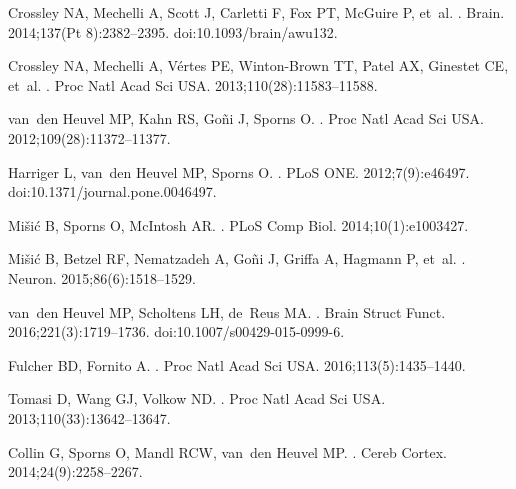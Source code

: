 \documentclass[10pt,letterpaper]{article}
\begin{document}
{\begin{thebibliography}{100}
Crossley NA, Mechelli A, Scott J, Carletti F, Fox PT, McGuire P, et~al.
.
\newblock Brain. 2014;137(Pt 8):2382--2395.
\newblock doi:{10.1093/brain/awu132}.

Crossley NA, Mechelli A, V{\'e}rtes PE, Winton-Brown TT, Patel AX, Ginestet CE,
  et~al.
.
\newblock Proc Natl Acad Sci USA. 2013;110(28):11583--11588.

van~den Heuvel MP, Kahn RS, Go{\~n}i J, Sporns O.
.
\newblock Proc Natl Acad Sci USA. 2012;109(28):11372--11377.

Harriger L, van~den Heuvel MP, Sporns O.
.
\newblock PLoS ONE. 2012;7(9):e46497.
\newblock doi:{10.1371/journal.pone.0046497}.

Mi{\v s}i{\'c} B, Sporns O, McIntosh AR.
.
\newblock PLoS Comp Biol. 2014;10(1):e1003427.

Mi{\v s}i{\'c} B, Betzel RF, Nematzadeh A, Go{\~n}i J, Griffa A, Hagmann P,
  et~al.
.
\newblock Neuron. 2015;86(6):1518--1529.

van~den Heuvel MP, Scholtens LH, de~Reus MA.
.
\newblock Brain Struct Funct. 2016;221(3):1719--1736.
\newblock doi:{10.1007/s00429-015-0999-6}.

Fulcher BD, Fornito A.
.
\newblock Proc Natl Acad Sci USA. 2016;113(5):1435--1440.

Tomasi D, Wang GJ, Volkow ND.
.
\newblock Proc Natl Acad Sci USA. 2013;110(33):13642--13647.

Collin G, Sporns O, Mandl RCW, van~den Heuvel MP.
.
\newblock Cereb Cortex. 2014;24(9):2258--2267.


\end{thebibliography}}
\end{document}
